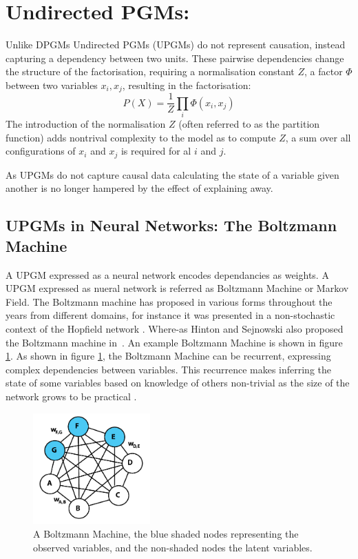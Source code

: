 \section{Undirected PGMs:}

Unlike DPGMs Undirected PGMs (UPGMs) do not represent causation, instead capturing a dependency between two units. These pairwise dependencies change the structure of the factorisation, requiring a normalisation constant $Z$, a factor $\Phi$ between two variables $x_i,x_j$, resulting in the factorisation:
$$
P(X) = \frac{1}{Z} \prod_i \Phi(x_i, x_j)
$$
The introduction of the normalisation $Z$ (often referred to as the partition function) adds nontrival complexity to the model as to compute $Z$, a sum over all configurations of $x_i$ and $x_j$ is required for al $i$ and $j$.

As UPGMs do not capture causal data calculating the state of a variable given another is no longer hampered by the effect of explaining away.

\subsection{UPGMs in Neural Networks: The Boltzmann Machine}

A UPGM expressed as a neural network encodes dependancies as weights. A UPGM expressed as nueral network is referred as Boltzmann Machine or Markov Field.
The Boltzmann machine has proposed in various forms throughout the years from different domains, for instance it was presented in a non-stochastic context of the Hopfield network \cite{Hopfield01041982}. Where-as Hinton and Sejnowski also proposed the Boltzmann machine in~\cite{geoffreye.hintonterrencej.sejnowski1983}. An example Boltzmann Machine is shown in figure \ref{F:Boltzmann-Machine}. As shown in figure \ref{F:Boltzmann-Machine}, the Boltzmann Machine can be recurrent, expressing complex dependencies between variables. This recurrence makes inferring the state of some variables based on knowledge of others non-trivial as the size of the network grows to be practical \todocite{}.
\begin{figure}[h]
\begin{center}
  \includegraphics[width = 0.4\textwidth]{Assets/Boltzmann_Machine.png}
\caption{A Boltzmann Machine, the blue shaded nodes representing the observed variables, and the non-shaded nodes the latent variables.}
\label{F:Boltzmann-Machine}
\end{center}
\end{figure}


